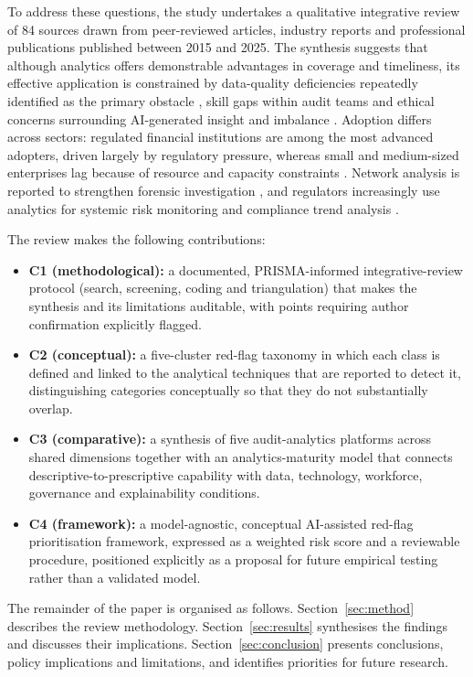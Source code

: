 \documentclass[conference]{IEEEtran}
\begin{document}
To address these questions, the study undertakes a qualitative integrative review of 84 sources drawn from peer-reviewed articles, industry reports and professional publications published between 2015 and 2025. The synthesis suggests that although analytics offers demonstrable advantages in coverage and timeliness, its effective application is constrained by data-quality deficiencies repeatedly identified as the primary obstacle \cite{b15}, skill gaps within audit teams \cite{b16} and ethical concerns surrounding AI-generated insight and imbalance \cite{b17}. Adoption differs across sectors: regulated financial institutions are among the most advanced adopters, driven largely by regulatory pressure, whereas small and medium-sized enterprises lag because of resource and capacity constraints \cite{b18,b19}. Network analysis is reported to strengthen forensic investigation \cite{b20}, and regulators increasingly use analytics for systemic risk monitoring and compliance trend analysis \cite{b21}.

The review makes the following contributions:
\begin{itemize}
    \item \textbf{C1 (methodological):} a documented, PRISMA-informed integrative-review protocol (search, screening, coding and triangulation) that makes the synthesis and its limitations auditable, with points requiring author confirmation explicitly flagged.
    \item \textbf{C2 (conceptual):} a five-cluster red-flag taxonomy in which each class is defined and linked to the analytical techniques that are reported to detect it, distinguishing categories conceptually so that they do not substantially overlap.
    \item \textbf{C3 (comparative):} a synthesis of five audit-analytics platforms across shared dimensions together with an analytics-maturity model that connects descriptive-to-prescriptive capability with data, technology, workforce, governance and explainability conditions.
    \item \textbf{C4 (framework):} a model-agnostic, conceptual AI-assisted red-flag prioritisation framework, expressed as a weighted risk score and a reviewable procedure, positioned explicitly as a proposal for future empirical testing rather than a validated model.
\end{itemize}

The remainder of the paper is organised as follows. Section~\ref{sec:method} describes the review methodology. Section~\ref{sec:results} synthesises the findings and discusses their implications. Section~\ref{sec:conclusion} presents conclusions, policy implications and limitations, and identifies priorities for future research.
\end{document}
